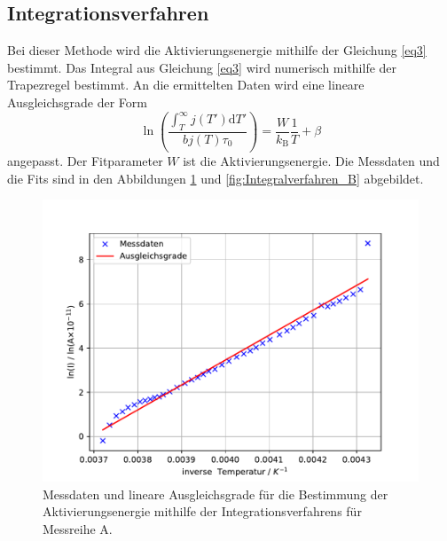 \subsection{Integrationsverfahren}
Bei dieser Methode wird die Aktivierungsenergie mithilfe der Gleichung \eqref{eq3}  bestimmt.
Das Integral aus Gleichung \eqref{eq3} wird numerisch mithilfe der Trapezregel bestimmt.
An die ermittelten Daten wird eine lineare Ausgleichsgrade der Form 
\begin{equation*}
    \ln{ \left( \frac{ \int_{T}^\infty j(T') \mathrm{d}T' }{ b j(T) \tau_{\text{0}} } \right) } = \frac{W}{k_{\text{{B}}}} \frac{1}{T} +\beta
\end{equation*}
angepasst. Der Fitparameter $W$ ist die Aktivierungsenergie.
Die Messdaten und die Fits sind in den Abbildungen \ref{fig:Integralverfahren_A} und \ref{fig:Integralverfahren_B} abgebildet.
\FloatBarrier
\begin{figure}
    \centering
    \includegraphics[width= \textwidth,keepaspectratio]{figure/Integralverfahren_A.pdf}
    \caption{Messdaten und lineare Ausgleichsgrade für die Bestimmung der Aktivierungsenergie mithilfe der Integrationsverfahrens für Messreihe A.}
    \label{fig:Integralverfahren_A}
\end{figure}
